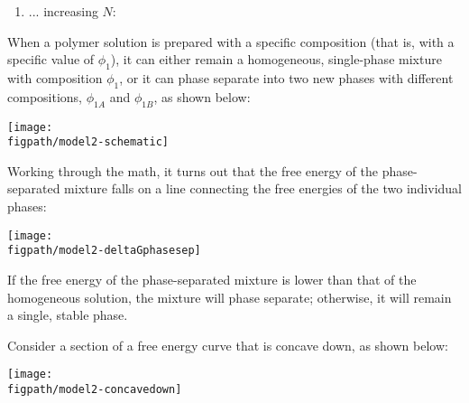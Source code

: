 \begin{activity}
\begin{ctqs}
\begin{enumerate}
				\begin{solution}[1.75in]
				\end{solution}
		
			\clearpage
			\item ... increasing $N$:
	
				\begin{solution}[1.75in]
				\end{solution}
		
		\end{enumerate}
		
\end{ctqs}



\begin{model}

	When a polymer solution is prepared with a specific composition (that is, with a specific value of $\phi_1$), it can either remain a homogeneous, single-phase mixture with composition $\phi_1$, or it can phase separate into two new phases with different compositions, $\phi_{1A}$ and $\phi_{1B}$, as shown below:
	
		\centerline{\texttt{[image: \\figpath/model2-schematic]}}
	
	
	Working through the math, it turns out that the free energy of the phase-separated mixture falls on a line connecting the free energies of the two individual phases:
	
		\vspace{0.1in}
		\centerline{\texttt{[image: \\figpath/model2-deltaGphasesep]}}
	
	If the free energy of the phase-separated mixture is lower than that of the homogeneous solution, the mixture will phase separate; otherwise, it will remain a single, stable phase.

\end{model}

		\vspace{0.1in}
\begin{ctqs}
		\question Consider a section of a free energy curve that is concave down, as shown below:
	
		\vspace{0.1in}
		\centerline{\texttt{[image: \\figpath/model2-concavedown]}}


\end{ctqs}
\end{activity}

